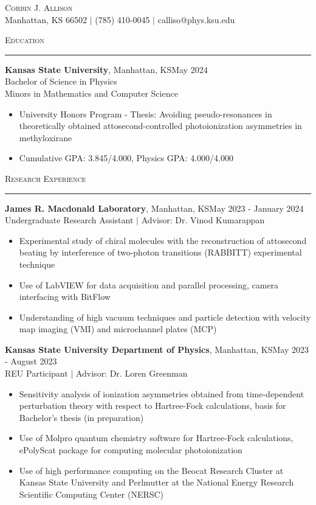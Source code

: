 \documentclass{article}
\newcommand{\sect}[1]{
\noindent\large{\textsc{#1}}\\[-6pt]\normalsize{\noindent\rule{\textwidth}{0.5pt}}
}
\begin{document}
\noindent\begin{center}
	{\huge{\textsc{Corbin J. Allison}}}\\
	Manhattan, KS 66502 $ | $ (785) 410-0045 $ | $ calliso@phys.ksu.edu
\end{center}
\sect{Education} \textbf{Kansas State University}, Manhattan, KS\hfill May 2024 \\
Bachelor of Science in Physics\\ Minors in Mathematics and Computer Science \begin{itemize}
	\item University Honors Program - Thesis: Avoiding pseudo-resonances in theoretically obtained attosecond-controlled photoionization asymmetries in methyloxirane
	\item Cumulative GPA: 3.845/4.000, Physics GPA: 4.000/4.000
\end{itemize}
\sect{Research Experience}
\textbf{James R. Macdonald Laboratory}, Manhattan, KS\hfill May 2023 - January 2024\\
{Undergraduate Research Assistant $ | $ Advisor: Dr. Vinod Kumarappan} \begin{itemize}
	\item Experimental study of chiral molecules with the reconstruction of attosecond beating by interference of two-photon transitions (RABBITT) experimental technique
	\item Use of LabVIEW for data acquisition and parallel processing, camera interfacing with BitFlow
	\item Understanding of high vacuum techniques and particle detection with velocity map imaging (VMI) and microchannel plates (MCP)
\end{itemize}
\textbf{Kansas State University Department of Physics}, Manhattan, KS\hfill May 2023 - August 2023\\
{REU Participant $ | $ Advisor: Dr. Loren Greenman} \begin{itemize}
	\item Sensitivity analysis of ionization asymmetries obtained from time-dependent perturbation theory with respect to Hartree-Fock calculations, basis for Bachelor's thesis (in preparation)
	\item Use of Molpro quantum chemistry software for Hartree-Fock calculations, ePolyScat package for computing molecular photoionization
	\item Use of high performance computing on the Beocat Research Cluster at Kansas State University and Perlmutter at the National Energy Research Scientific Computing Center (NERSC) 
\end{itemize}
\end{document}
